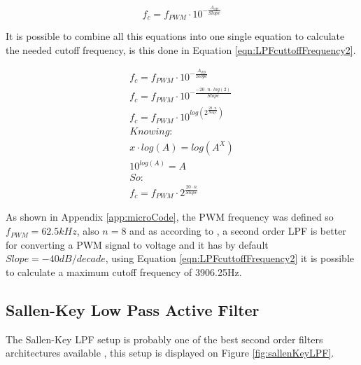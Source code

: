 			\begin{equation}\label{eqn:LPFcuttoffFrequency}
				f_{c}=f_{PWM} \cdot 10^{-\frac{A_{dB}}{Slope}}
			\end{equation}

		It is possible to combine all this equations into one single equation to calculate the needed cutoff frequency, is this done in Equation \ref{eqn:LPFcuttoffFrequency2}.

			\begin{equation}\label{eqn:LPFcuttoffFrequency2}
				\begin{split}
					f_{c}=f_{PWM} \cdot 10^{-\frac{A_{dB}}{Slope}}	\\
					f_{c}=f_{PWM} \cdot 10^{-\frac{-20 \cdot n \cdot log \left( 2 \right)}{Slope}}	\\
					f_{c}=f_{PWM} \cdot 10^{log \left( 2^{\frac{20 \cdot n }{Slope}} \right)}	\\
					Knowing:	\\
					x \cdot log \left( A \right) =  log \left( A^{X} \right) \\
					10^{log \left( A \right) } = A	\\
					So:	\\
					f_{c}=f_{PWM} \cdot  2^{\frac{20 \cdot n}{Slope}}
				\end{split}
			\end{equation}

	
		As shown in Appendix \ref{app:microCode}, the PWM frequency was defined so $f_{PWM}=62.5kHz$, also $n=8$ and as according to \cite{metivier2013pwm}, a second order LPF is better for converting a PWM signal to voltage and it has by default $Slope=-40dB/decade$, using Equation \ref{eqn:LPFcuttoffFrequency2} it is possible to calculate a maximum cutoff frequency of 3906.25Hz. 

	\subsection{Sallen-Key Low Pass Active Filter}
	
		The Sallen-Key LPF setup is probably one of the best second order filters architectures available \cite{dorfSvodoba2014}, this setup is displayed on Figure \ref{fig:sallenKeyLPF}.

